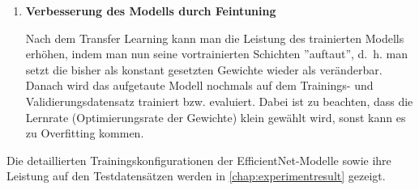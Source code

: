 \begin{enumerate}
	\item \textbf{Verbesserung des Modells durch Feintuning}
	
	Nach dem Transfer Learning kann man die Leistung des trainierten Modells erhöhen, indem man nun seine vortrainierten Schichten ''auftaut'', d.~h. man setzt die bisher als konstant gesetzten Gewichte wieder als veränderbar. Danach wird das aufgetaute Modell nochmals auf dem Trainings- und Validierungsdatensatz trainiert bzw. evaluiert. Dabei ist zu beachten, dass die Lernrate (Optimierungsrate der Gewichte) klein gewählt wird, sonst kann es zu Overfitting kommen.
\end{enumerate}

Die detaillierten Trainingskonfigurationen der EfficientNet-Modelle sowie ihre Leistung auf den Testdatensätzen werden in \autoref{chap:experimentresult} gezeigt.

